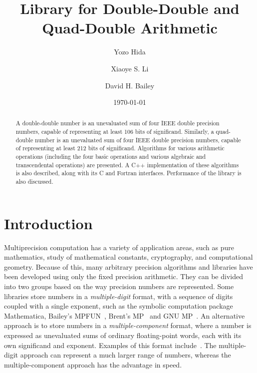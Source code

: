 \documentclass[11pt]{article}
\title{Library for Double-Double and Quad-Double Arithmetic\footnotemark[1]}
\author{Yozo Hida\footnotemark[2] \and Xiaoye S. Li\footnotemark[3]
  \and David H. Bailey\footnotemark[3]}
\date{\today}
\theoremstyle{definition}
\begin{document}
\maketitle

\renewcommand{\thefootnote}{\fnsymbol{footnote}}


\renewcommand{\thefootnote}{\arabic{footnote}}

\vspace{1cm}
\begin{abstract}
  A double-double number is an unevaluated sum of four IEEE double 
  precision numbers, capable of representing at least 106 bits of 
  significand.   Similarly, a quad-double number is an unevaluated sum of 
  four IEEE double precision numbers, capable of representing at least 
  212 bits of significand.  Algorithms for various arithmetic operations 
  (including the four basic operations and various algebraic and 
  transcendental operations) are presented. A C++ implementation of 
  these algorithms is also described, along with its C and Fortran 
  interfaces.  Performance of the library is also discussed.
\end{abstract}

\newpage
\tableofcontents
\newpage

\section{Introduction} \label{sec:intro}
Multiprecision computation has a variety of application areas, such as
pure mathematics, study of mathematical constants, cryptography,
and computational geometry. Because of this, many arbitrary precision 
algorithms and libraries have been developed using only the fixed
precision arithmetic. They can be divided into two groups based on
the way precision numbers are represented. Some libraries store numbers in a
{\em multiple-digit} format, with a sequence of digits coupled with a 
single exponent, such as the symbolic computation package
Mathematica, Bailey's MPFUN~\cite{bai-mp}, Brent's MP~\cite{brent} and
GNU MP~\cite{gnu-mp}.  An alternative approach is to store numbers
in a {\em multiple-component} format, where a number is expressed
as unevaluated sums of ordinary floating-point words, each with its own
significand and exponent.  Examples of this format 
include~\cite{dek71,pri92,she97}.  The multiple-digit approach can 
represent a much larger range of numbers, whereas the multiple-component 
approach has the advantage in speed.
\end{document}
